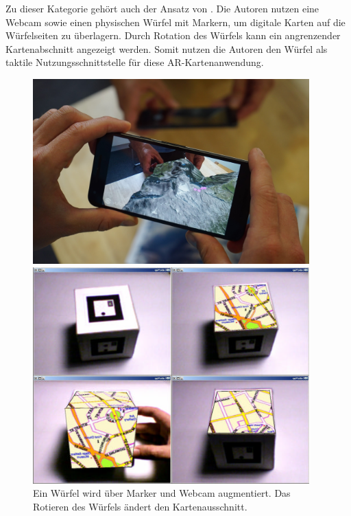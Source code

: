 Zu dieser Kategorie gehört auch der Ansatz von \textcite{Moore2005}.
Die Autoren nutzen eine Webcam sowie einen physischen Würfel mit Markern, um digitale Karten auf die Würfelseiten zu überlagern.
Durch Rotation des Würfels kann ein angrenzender Kartenabschnitt angezeigt werden.
Somit nutzen die Autoren den Würfel als taktile Nutzungsschnittstelle für diese AR-Kartenanwendung.

\begin{figure}[h]
\centering
\begin{minipage}[t]{0.48\textwidth}
    \includegraphics[width=0.95\textwidth, height=0.25\textheight]{figures/wiehr2017_artopos.png}
    \caption{%
        Mit \emph{ARTopos} wird eine topologische Papierkarte augmentiert, um kollaborativ Routen zu planen. %
    }
    \label{fig:wiehr2017_artopos}
\end{minipage}
\hfill
\begin{minipage}[t]{0.48\textwidth}
    \includegraphics[width=0.95\textwidth, height=0.25\textheight]{figures/moore2005_cube.png}
    \caption{%
        Ein Würfel wird über Marker und Webcam augmentiert. %
        Das Rotieren des Würfels ändert den Kartenausschnitt. %
    }
    \label{fig:moore2005_cube}
\end{minipage}%
\end{figure}

